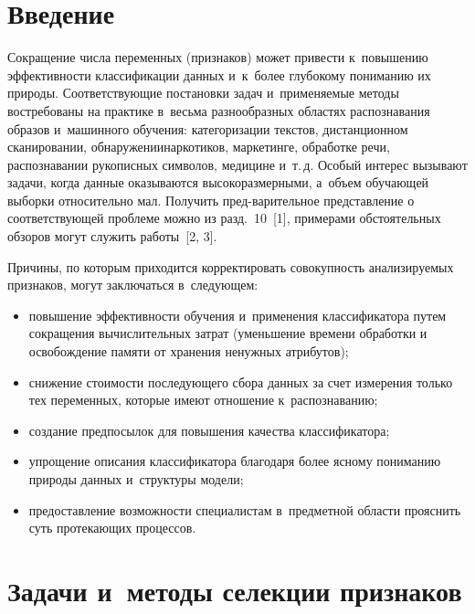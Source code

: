 \begin{multicols}{2}

\label{st\stat}
  


\section{Введение}
     
     Сокращение числа переменных (признаков) может привести 
к~повышению эффективности классификации данных и~к~более глубокому 
пониманию их природы. Соответствующие постановки задач и~применяемые 
методы востребованы на практике в~весьма разнообразных областях 
распознавания образов и~машинного обучения: категоризации текстов, 
дистанционном сканировании, обнаружении\linebreak наркотиков, маркетинге, 
обработке речи, распознавании рукописных символов, медицине и~т.\,д. 
Особый интерес вызывают задачи, когда данные оказываются 
высокоразмерными, а~объем обуча\-ющей выборки относительно мал. Получить 
пред-\linebreak варительное представление о соответствующей проблеме можно из 
разд.~10~[1], примерами обстоятельных обзоров могут служить работы~[2, 
3]. 
     
     Причины, по которым приходится корректировать совокупность 
анализируемых признаков, могут заключаться в~следующем: 
     \begin{itemize}
\item повышение эффективности обучения и~применения классификатора 
путем сокращения вычислительных затрат (уменьшение времени обработки 
и освобождение памяти от хранения ненужных атрибутов);
\item снижение стоимости последующего сбора данных за счет измерения 
только тех переменных, которые имеют отношение к~распознаванию;
\item создание предпосылок для повышения качества классификатора; 
\item упрощение описания классификатора благодаря более ясному 
пониманию природы данных и~структуры модели;
\item предоставление возможности специалистам в~предметной области 
прояснить суть протекающих процессов.
\end{itemize}

\section{Задачи и~методы селекции признаков}


\end{multicols}
